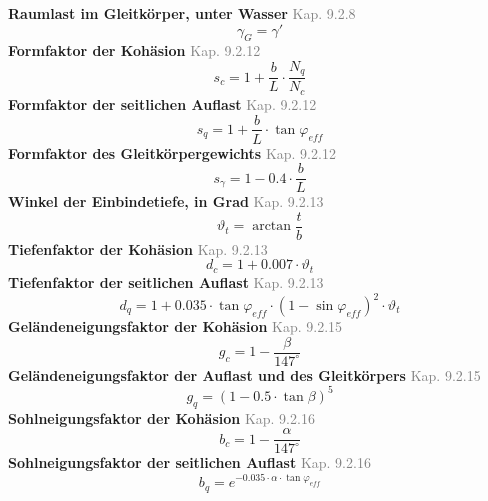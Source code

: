 \documentclass[11pt,a4paper]{article}
\newcommand{\normref}[1]{{\small\textcolor{gray}{#1}}}
\begin{document}
\noindent\textbf{Raumlast im Gleitkörper, unter Wasser} \hfill \normref{Kap. 9.2.8}
\begin{equation*}
\gamma_G = \gamma'
\end{equation*}
\noindent\textbf{Formfaktor der Kohäsion} \hfill \normref{Kap. 9.2.12}
\begin{equation*}
s_c = 1 + \frac{b}{L} \cdot \frac{N_q}{N_c}
\end{equation*}
\noindent\textbf{Formfaktor der seitlichen Auflast} \hfill \normref{Kap. 9.2.12}
\begin{equation*}
s_q = 1 + \frac{b}{L} \cdot \tan \varphi_{eff}
\end{equation*}
\noindent\textbf{Formfaktor des Gleitkörpergewichts} \hfill \normref{Kap. 9.2.12}
\begin{equation*}
s_{\gamma} = 1 - 0.4 \cdot \frac{b}{L}
\end{equation*}
\noindent\textbf{Winkel der Einbindetiefe, in Grad} \hfill \normref{Kap. 9.2.13}
\begin{equation*}
\vartheta_t = \arctan\frac{t}{b}
\end{equation*}
\noindent\textbf{Tiefenfaktor der Kohäsion} \hfill \normref{Kap. 9.2.13}
\begin{equation*}
d_c = 1 + 0.007 \cdot \vartheta_t
\end{equation*}
\noindent\textbf{Tiefenfaktor der seitlichen Auflast} \hfill \normref{Kap. 9.2.13}
\begin{equation*}
d_q = 1 + 0.035 \cdot \tan \varphi_{eff} \cdot \left(1 - \sin \varphi_{eff}\right)^{2} \cdot \vartheta_t
\end{equation*}
\noindent\textbf{Geländeneigungsfaktor der Kohäsion} \hfill \normref{Kap. 9.2.15}
\begin{equation*}
g_c = 1 - \frac{\beta}{147^\circ}
\end{equation*}
\noindent\textbf{Geländeneigungsfaktor der Auflast und des Gleitkörpers} \hfill \normref{Kap. 9.2.15}
\begin{equation*}
g_q = \left(1 - 0.5 \cdot \tan \beta\right)^{5}
\end{equation*}
\noindent\textbf{Sohlneigungsfaktor der Kohäsion} \hfill \normref{Kap. 9.2.16}
\begin{equation*}
b_c = 1 - \frac{\alpha}{147^\circ}
\end{equation*}
\noindent\textbf{Sohlneigungsfaktor der seitlichen Auflast} \hfill \normref{Kap. 9.2.16}
\begin{equation*}
b_q = e^{-0.035 \cdot \alpha \cdot \tan \varphi_{eff}}
\end{equation*}
\end{document}
